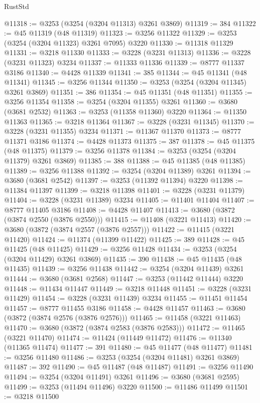 \begin{lexlean}{RustStd}
\begin{coremodule}
@11318 := @3253 (@3254 (@3204 @11313) @3261 @3869)
@11319 := 384
@11322 := @45 @11319 (@48 @11319)
@11323 := @3256 @11322
@11329 := @3253 (@3254 (@3204 @11323) @3261 @7095) @3220
@11330 := @11318 @11329
@11331 := @3218 @11330
@11333 := @3228 (@3231 @11313)
@11336 := @3228 (@3231 @11323) @3234
@11337 := @11333 @11336
@11339 := @8777 @11337 @3186
@11340 := @4428 @11339
@11341 := 385
@11344 := @45 @11341 (@48 @11341)
@11345 := @3256 @11344
@11350 := @3253 (@3254 (@3204 @11345) @3261 @3869)
@11351 := 386
@11354 := @45 @11351 (@48 @11351)
@11355 := @3256 @11354
@11358 := @3254 (@3204 @11355) @3261
@11360 := @3680 (@3681 @2532)
@11363 := @3253 (@11358 @11360) @3220
@11364 := @11350 @11363
@11365 := @3218 @11364
@11367 := @3228 (@3231 @11345)
@11370 := @3228 (@3231 @11355) @3234
@11371 := @11367 @11370
@11373 := @8777 @11371 @3186
@11374 := @4428 @11373
@11375 := 387
@11378 := @45 @11375 (@48 @11375)
@11379 := @3256 @11378
@11384 := @3253 (@3254 (@3204 @11379) @3261 @3869)
@11385 := 388
@11388 := @45 @11385 (@48 @11385)
@11389 := @3256 @11388
@11392 := @3254 (@3204 @11389) @3261
@11394 := @3680 (@3681 @2542)
@11397 := @3253 (@11392 @11394) @3220
@11398 := @11384 @11397
@11399 := @3218 @11398
@11401 := @3228 (@3231 @11379)
@11404 := @3228 (@3231 @11389) @3234
@11405 := @11401 @11404
@11407 := @8777 @11405 @3186
@11408 := @4428 @11407
@11413 := @3680 (@3872 (@3874 @2550 (@3876 @2550)))
@11415 := @11408 (@3221 @11413)
@11420 := @3680 (@3872 (@3874 @2557 (@3876 @2557)))
@11422 := @11415 (@3221 @11420)
@11424 := @11374 (@11399 @11422)
@11425 := 389
@11428 := @45 @11425 (@48 @11425)
@11429 := @3256 @11428
@11434 := @3253 (@3254 (@3204 @11429) @3261 @3869)
@11435 := 390
@11438 := @45 @11435 (@48 @11435)
@11439 := @3256 @11438
@11442 := @3254 (@3204 @11439) @3261
@11444 := @3680 (@3681 @2568)
@11447 := @3253 (@11442 @11444) @3220
@11448 := @11434 @11447
@11449 := @3218 @11448
@11451 := @3228 (@3231 @11429)
@11454 := @3228 (@3231 @11439) @3234
@11455 := @11451 @11454
@11457 := @8777 @11455 @3186
@11458 := @4428 @11457
@11463 := @3680 (@3872 (@3874 @2576 (@3876 @2576)))
@11465 := @11458 (@3221 @11463)
@11470 := @3680 (@3872 (@3874 @2583 (@3876 @2583)))
@11472 := @11465 (@3221 @11470)
@11474 := @11424 (@11449 @11472)
@11476 := @11340 (@11365 @11474)
@11477 := 391
@11480 := @45 @11477 (@48 @11477)
@11481 := @3256 @11480
@11486 := @3253 (@3254 (@3204 @11481) @3261 @3869)
@11487 := 392
@11490 := @45 @11487 (@48 @11487)
@11491 := @3256 @11490
@11494 := @3254 (@3204 @11491) @3261
@11496 := @3680 (@3681 @2595)
@11499 := @3253 (@11494 @11496) @3220
@11500 := @11486 @11499
@11501 := @3218 @11500

\end{coremodule}
\end{lexlean}
